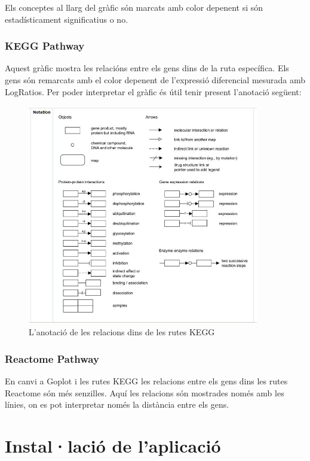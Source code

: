\documentclass[]{article}
\begin{document}
Els conceptes al llarg del gràfic són marcats amb color depenent si són estadísticament significatius o no.

\subsubsection{KEGG Pathway}
Aquest gràfic mostra les relacións entre els gens dins de la ruta específica. Els gens són remarcats amb el color depenent de l'expressió diferencial mesurada amb LogRatios. Per poder interpretar el gràfic és útil tenir present l'anotació següent:

\begin{figure}[H]
\centering
\includegraphics[width=0.9\textwidth]{Annotation_KEGG.jpg} 
\caption{L'anotació de les relacions dins de les rutes KEGG}
\end{figure}

\subsubsection{Reactome Pathway}
En canvi a Goplot i les rutes KEGG les relacions entre els gens dins les rutes Reactome són més senzilles. Aquí les relacions són mostrades només amb les línies, on es pot interpretar només la distància entre els gens. 



\section{Instal·lació de l'aplicació}
\end{document}
